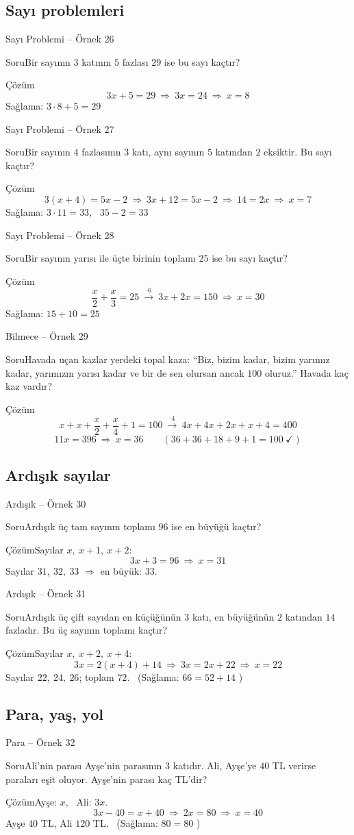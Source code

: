 \documentclass[aspectratio=169,11pt,handout]{beamer}
\newcommand{\soru}[3]{%
\begin{frame}{#1}
  \begin{block}{Soru}\large #2\end{block}
  \pause
  \begin{exampleblock}{Çözüm}\large #3\end{exampleblock}
\end{frame}}
\begin{document}
\subsection{Sayı problemleri}
\soru{Sayı Problemi -- Örnek 26}
{Bir sayının \(3\) katının \(5\) fazlası \(29\) ise bu sayı kaçtır?}
{\[3x+5=29\ \Rightarrow\ 3x=24\ \Rightarrow\ x=8\]
Sağlama: \(3\cdot 8+5=29\) \checkmark}

\soru{Sayı Problemi -- Örnek 27}
{Bir sayının \(4\) fazlasının \(3\) katı, aynı sayının \(5\) katından \(2\) eksiktir. Bu sayı kaçtır?}
{\[3(x+4)=5x-2\ \Rightarrow\ 3x+12=5x-2\ \Rightarrow\ 14=2x\ \Rightarrow\ x=7\]
Sağlama: \(3\cdot 11=33\), \ \(35-2=33\) \checkmark}

\soru{Sayı Problemi -- Örnek 28}
{Bir sayının yarısı ile üçte birinin toplamı \(25\) ise bu sayı kaçtır?}
{\[\frac{x}{2}+\frac{x}{3}=25\ \xrightarrow{\cdot 6}\ 3x+2x=150\ \Rightarrow\ x=30\]
Sağlama: \(15+10=25\) \checkmark}

\soru{Bilmece -- Örnek 29}
{Havada uçan kazlar yerdeki topal kaza: ``Biz, bizim kadar, bizim yarımız kadar, yarımızın yarısı kadar ve bir de sen olursan ancak \(100\) oluruz.'' Havada kaç kaz vardır?}
{\[x+x+\frac{x}{2}+\frac{x}{4}+1=100\ \xrightarrow{\cdot 4}\ 4x+4x+2x+x+4=400\]
\[11x=396\ \Rightarrow\ x=36\qquad(36+36+18+9+1=100\ \checkmark)\]}

\subsection{Ardışık sayılar}
\soru{Ardışık -- Örnek 30}
{Ardışık üç tam sayının toplamı \(96\) ise en büyüğü kaçtır?}
{Sayılar \(x,\ x+1,\ x+2\):
\[3x+3=96\ \Rightarrow\ x=31\]
Sayılar \(31,\ 32,\ 33\) \(\Rightarrow\) en büyük: \(33\).}

\soru{Ardışık -- Örnek 31}
{Ardışık üç çift sayıdan en küçüğünün \(3\) katı, en büyüğünün \(2\) katından \(14\) fazladır. Bu üç sayının toplamı kaçtır?}
{Sayılar \(x,\ x+2,\ x+4\):
\[3x=2(x+4)+14\ \Rightarrow\ 3x=2x+22\ \Rightarrow\ x=22\]
Sayılar \(22,\ 24,\ 26\); toplam \(72\). \ (Sağlama: \(66=52+14\) \checkmark)}

\subsection{Para, yaş, yol}
\soru{Para -- Örnek 32}
{Ali'nin parası Ayşe'nin parasının \(3\) katıdır. Ali, Ayşe'ye \(40\) TL verirse paraları eşit oluyor. Ayşe'nin parası kaç TL'dir?}
{Ayşe: \(x\), \ Ali: \(3x\).
\[3x-40=x+40\ \Rightarrow\ 2x=80\ \Rightarrow\ x=40\]
Ayşe \(40\) TL, Ali \(120\) TL. \ (Sağlama: \(80=80\) \checkmark)}
\end{document}
